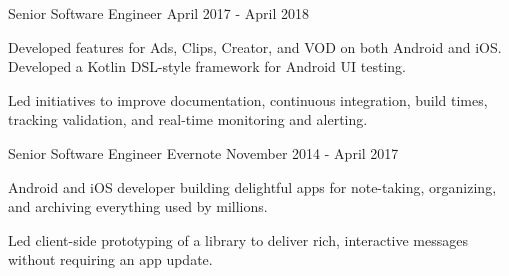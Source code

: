 \begin{cventries}
  \cventry
    {Senior Software Engineer} %
    {} %
    {} %
    {April 2017 - April 2018} %
    {
	\begin{cvitems} %
      	\item Developed features for Ads, Clips, Creator, and VOD on both Android and iOS. Developed a Kotlin DSL-style framework for Android UI testing.
      	\item Led initiatives to improve documentation, continuous integration, build times, tracking validation, and real-time monitoring and alerting.
	\end{cvitems}
    }

  \cventry
    {Senior Software Engineer} %
    {Evernote} %
    {} %
    {November 2014 - April 2017} %
    {
	\begin{cvitems} %
		\item Android and iOS developer building delightful apps for note-taking, organizing, and archiving everything used by millions.
		\item {Led client-side prototyping of a library to deliver rich, interactive messages without requiring an app update.}
	\end{cvitems}
    }


\end{cventries}
